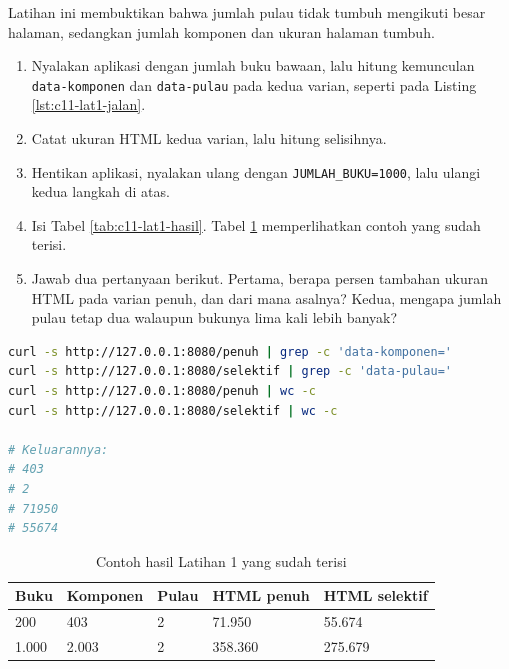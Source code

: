 Latihan ini membuktikan bahwa jumlah pulau tidak tumbuh mengikuti besar
halaman, sedangkan jumlah komponen dan ukuran halaman tumbuh.

\begin{enumerate}
  \item Nyalakan aplikasi dengan jumlah buku bawaan, lalu hitung kemunculan
        \texttt{data-komponen} dan \texttt{data-pulau} pada kedua varian,
        seperti pada Listing \ref{lst:c11-lat1-jalan}.
  \item Catat ukuran HTML kedua varian, lalu hitung selisihnya.
  \item Hentikan aplikasi, nyalakan ulang dengan
        \texttt{JUMLAH\_BUKU=1000}, lalu ulangi kedua langkah di atas.
  \item Isi Tabel \ref{tab:c11-lat1-hasil}. Tabel \ref{tab:c11-lat1-contoh}
        memperlihatkan contoh yang sudah terisi.
  \item Jawab dua pertanyaan berikut. Pertama, berapa persen tambahan ukuran
        HTML pada varian penuh, dan dari mana asalnya? Kedua, mengapa jumlah
        pulau tetap dua walaupun bukunya lima kali lebih banyak?
\end{enumerate}

\begin{lstlisting}[language=bash, caption={Menghitung komponen dan ukuran halaman, tersedia di \berkas{sources/chapter11/aplikasi.py}}, label={lst:c11-lat1-jalan}]
curl -s http://127.0.0.1:8080/penuh | grep -c 'data-komponen='
curl -s http://127.0.0.1:8080/selektif | grep -c 'data-pulau='
curl -s http://127.0.0.1:8080/penuh | wc -c
curl -s http://127.0.0.1:8080/selektif | wc -c

# Keluarannya:
# 403
# 2
# 71950
# 55674
\end{lstlisting}

\begin{table}[!htb]
  \centering
  \caption{Contoh hasil Latihan 1 yang sudah terisi}
  \label{tab:c11-lat1-contoh}
  \begin{tabularx}{\textwidth}{Xllll}
    \hline
    \textbf{Buku} & \textbf{Komponen} & \textbf{Pulau} & \textbf{HTML penuh} & \textbf{HTML selektif} \\
    \hline
    200 & 403 & 2 & 71.950 & 55.674 \\
    \hline
    1.000 & 2.003 & 2 & 358.360 & 275.679 \\
    \hline
  \end{tabularx}
\end{table}


